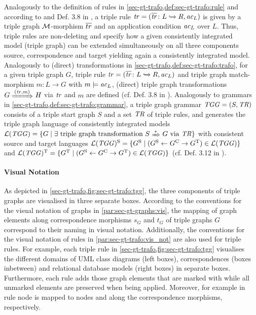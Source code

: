 Analogously to the definition of rules in \cref{sec-gt-trafo,def:sec-gt-trafo:rule} and according to \cite{GEH11} and Def. 3.8 in \cite{FAGT2}, a triple rule $\mathit{tr}=(\overline{\mathit{tr}}\colon L \xhookrightarrow{} R,\mathit{ac}_L)$ is given by a triple graph ${\cal M}$-morphism $\overline{tr}$ and an application condition $\mathit{ac}_L$ over $L$.
Thus, triple rules are non-deleting and specify how a given consistently integrated model (triple graph) can be extended simultaneously on all three components source, correspondence and target yielding again a consistently integrated model. 
Analogously to (direct) transformations in \cref{sec-gt-trafo,def:sec-gt-trafo:trafo}, for a given triple graph $G$, triple rule $\mathit{tr}=(\overline{\mathit{tr}}\colon L \xhookrightarrow{} R,\mathit{ac}_L)$ and triple graph match-morphism $m\colon L \to G$ with $m \models \mathit{ac}_L$, (direct) triple graph transformations $G \Trans{(\tr,m)} H$ via $\mathit{tr}$ and $m$ are defined (cf. Def. 3.8 in \cite{FAGT2}).
Analogously to grammars in \cref{sec-gt-trafo,def:sec-gt-trafo:grammar}, a triple graph grammar $\mathit{TGG}=(S,\mathit{TR})$ consists of a triple start graph $S$ and a set $\mathit{TR}$ of triple rules, and generates the triple graph language of consistently integrated models $\Lang(\TGG)=\{G \mid \exists \text{ triple graph transformation } S \Trans{*} G \text{ via }\TR\}$ with consistent source and target languages $\mathcal{L}(\mathit{TGG})^\mathrm{S}=\{G^\mathrm{S} \mid (G^\mathrm{S} \leftarrow G^\mathrm{C} \to G^\mathrm{T}) \in \mathcal{L}(\mathit{TGG}) \}$ and $\mathcal{L}(\mathit{TGG})^\mathrm{T}=\{G^\mathrm{T} \mid (G^\mathrm{S} \leftarrow G^\mathrm{C} \to G^\mathrm{T}) \in \mathcal{L}(\mathit{TGG}) \}$ (cf. Def. 3.12 in \cite{FAGT2}).

\paragraph*{Visual Notation}
As depicted in \cref{sec-gt-trafo,fig:sec-gt-trafo:tgg}, the three components of triple graphs are visualised in three separate boxes.
According to the conventions for the visual notation of graphs in \cref{par:sec-gt-graphs:vis}, the mapping of graph elements along correspondence morphisms $s_G$ and $t_G$ of triple graphs $G$ correspond to their naming in visual notation.
Additionally, the conventions for the visual notation of rules in \cref{par:sec-gt-trafo:vis_not} are also used for triple rules.
For example, each triple rule in \cref{sec-gt-trafo,fig:sec-gt-trafo:tgg} visualises the different domains of UML class diagrams (left boxes), correspondences (boxes inbetween) and relational database models (right boxes) in separate boxes.
Furthermore, each rule adds those graph elements that are marked with \code{++} while all unmarked elements are preserved when being applied.
Moreover, for example in rule  node  is mapped to nodes  and  along the correspondence morphisms, respectively.

